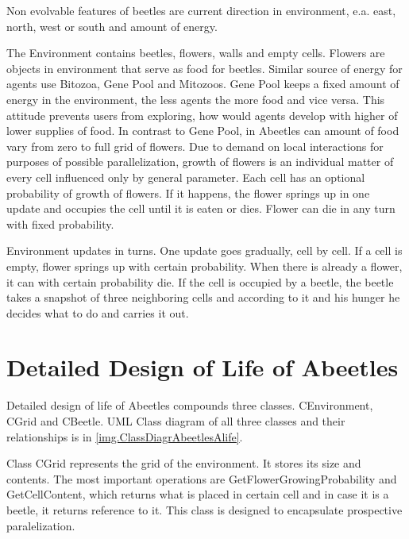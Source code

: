 \documentclass[a4paper,12pt]{report}
\begin{document}


Non evolvable features of beetles are current direction in environment, e.a. east, north, west or south and amount of energy.

The Environment contains beetles, flowers, walls and empty cells. Flowers are objects in environment that serve as food for beetles. Similar source of energy for agents use Bitozoa, Gene Pool and Mitozoos. Gene Pool keeps a fixed amount of energy in the environment, the less agents the more food and vice versa. This attitude prevents users from exploring, how would agents develop with higher of lower supplies of food. In contrast to Gene Pool, in Abeetles can amount of food vary from zero to full grid of flowers. Due to demand on local interactions for purposes of possible parallelization, growth of flowers is an individual matter of every cell influenced only by general parameter. Each cell has an optional probability of growth of flowers. If it happens, the flower springs up in one update and occupies the cell until it is eaten or dies. Flower can die in any turn with fixed probability.  

Environment updates in turns. One update goes gradually, cell by cell. If a cell is empty, flower springs up with certain probability. When there is already a flower, it can with certain probability die. If the cell is occupied by a beetle, the beetle takes a snapshot of three neighboring cells and according to it and his hunger he decides what to do and carries it out. 


\section{Detailed Design of Life of Abeetles}

Detailed design of life of Abeetles compounds three classes. CEnvironment, CGrid and CBeetle. UML Class diagram of all three classes and their relationships is in \ref{img.ClassDiagrAbeetlesAlife}. 

Class CGrid represents the grid of the environment. It stores its size and contents. The most important operations are GetFlowerGrowingProbability and GetCellContent, which returns what is placed in certain cell and in case it is a beetle, it returns reference to it. This class is designed to encapsulate prospective paralelization.
\end{document}
